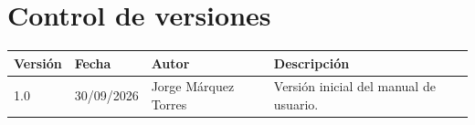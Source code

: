 \documentclass[12pt,a4paper,oneside,openany]{book}
\newcommand{\portadaAutor}{Jorge Márquez Torres}
\begin{document}
\frontmatter

\chapter*{Control de versiones}

\begin{tabularx}{\textwidth}{@{}l l l X@{}}
  \toprule
  \textbf{Versión} & \textbf{Fecha} & \textbf{Autor} & \textbf{Descripción} \\
  \midrule
  1.0 & 30/09/2026 & \portadaAutor & Versión inicial del manual de usuario. \\
  \bottomrule
\end{tabularx}

\tableofcontents
\listoffigures
\lstlistoflistings

\mainmatter



\end{document}

